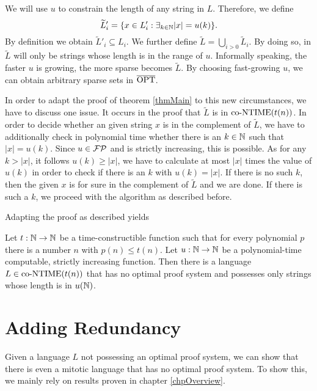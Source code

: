   We will use \(u\) to constrain the length of any string in \(L\). Therefore, we define
  \[
    \widetilde{L}'_i = \{ x \in L'_i : \exists_{k \in \mathbb{N}} |x| = u(k) \}. 
  \]
  By definition we obtain \(\widetilde{L}'_i \subseteq L_i\). We further define \(\widetilde{L} = \bigcup_{i>0} \widetilde{L}_i\). By doing so, in \(\widetilde{L}\) will only be strings whose length is in the range of \(u\). Informally speaking, the faster \(u\) is growing, the more sparse becomes \(\widetilde{L}\). By choosing fast-growing \(u\), we can obtain arbitrary sparse sets in \(\overline{\text{OPT}}\).

  In order to adapt the proof of theorem \ref{thmMain} to this new circumstances, we have to discuss one issue. It occurs in the proof that \(\widetilde{L}\) is in \(\text{co-NTIME}(t(n))\). In order to decide whether an given string \(x\) is in the complement of \(\widetilde{L}\), we have to additionally check in polynomial time whether there is an \(k \in \mathbb{N}\) such that \(|x| = u(k)\). Since \(u \in \mathcal{FP}\) and is strictly increasing, this is possible. As for any \(k > |x|\), it follows \(u(k) \geq |x|\), we have to calculate at most \(|x|\) times the value of \(u(k)\) in order to check if there is an \(k\) with \(u(k) = |x|\). If there is no such \(k\), then the given \(x\) is for sure in the complement of \(\widetilde{L}\) and we are done. If there is such a \(k\), we proceed with the algorithm as described before.

  Adapting the proof as described yields
  
  \begin{corollary} \label{corSparse}
    Let \(t:\mathbb{N}\to\mathbb{N}\) be a time-constructible function such that for every polynomial \(p\) there is a number \(n\) with \(p(n) \leq t(n)\). Let \(u:\mathbb{N}\to\mathbb{N}\) be a polynomial-time computable, strictly increasing function. Then there is a language \(L \in \text{co-NTIME}(t(n))\) that has no optimal proof system and possesses only strings whose length is in \(u(\mathbb{N})\).
  \end{corollary}


  \section{Adding Redundancy}

  Given a language \(L\) not possessing an optimal proof system, we can show that there is even a mitotic language that has no optimal proof system. To show this, we mainly rely on results proven in chapter \ref{chpOverview}.

